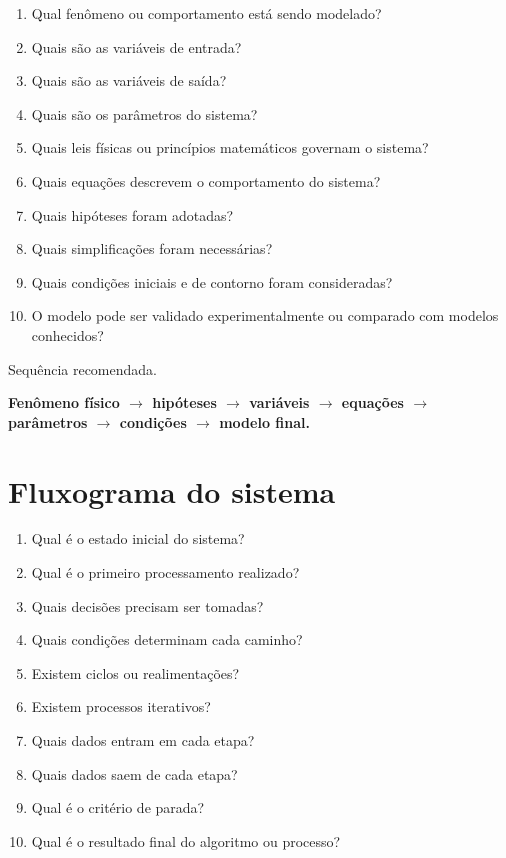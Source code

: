 \begin{enumerate}
	\item Qual fenômeno ou comportamento está sendo modelado?
	\item Quais são as variáveis de entrada?
	\item Quais são as variáveis de saída?
	\item Quais são os parâmetros do sistema?
	\item Quais leis físicas ou princípios matemáticos governam o sistema?
	\item Quais equações descrevem o comportamento do sistema?
	\item Quais hipóteses foram adotadas?
	\item Quais simplificações foram necessárias?
	\item Quais condições iniciais e de contorno foram consideradas?
	\item O modelo pode ser validado experimentalmente ou comparado com modelos conhecidos?
\end{enumerate}

{Sequência recomendada.}

\begin{center}
	\textbf{
		Fenômeno físico
		$\rightarrow$
		hipóteses
		$\rightarrow$
		variáveis
		$\rightarrow$
		equações
		$\rightarrow$
		parâmetros
		$\rightarrow$
		condições
		$\rightarrow$
		modelo final.
	}
\end{center}

\section{Fluxograma do sistema}

\begin{enumerate}
	\item Qual é o estado inicial do sistema?
	\item Qual é o primeiro processamento realizado?
	\item Quais decisões precisam ser tomadas?
	\item Quais condições determinam cada caminho?
	\item Existem ciclos ou realimentações?
	\item Existem processos iterativos?
	\item Quais dados entram em cada etapa?
	\item Quais dados saem de cada etapa?
	\item Qual é o critério de parada?
	\item Qual é o resultado final do algoritmo ou processo?
\end{enumerate}

